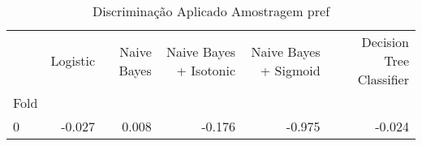 \begin{table}
\centering
\caption{Discriminação Aplicado Amostragem pref}
\label{Discriminação Aplicado Amostragem pref 8}
\begin{tabular}{lrrrrr}
\toprule
{} &  Logistic &  Naive Bayes &  Naive Bayes + Isotonic &  Naive Bayes + Sigmoid &  Decision Tree Classifier \\
Fold &           &              &                         &                        &                           \\
\midrule
0    &    -0.027 &        0.008 &                  -0.176 &                 -0.975 &                    -0.024 \\
\bottomrule
\end{tabular}
\end{table}
